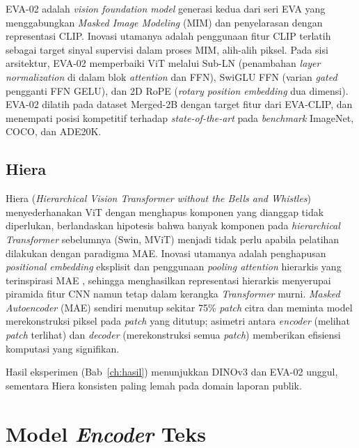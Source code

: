 EVA-02 \citep{fangEVA022023} adalah \textit{vision foundation model} generasi kedua dari seri EVA yang menggabungkan \textit{Masked Image Modeling} (MIM) dan penyelarasan dengan representasi CLIP. Inovasi utamanya adalah penggunaan fitur CLIP terlatih sebagai target sinyal supervisi dalam proses MIM, alih-alih piksel. Pada sisi arsitektur, EVA-02 memperbaiki ViT melalui Sub-LN (penambahan \textit{layer normalization} di dalam blok \textit{attention} dan FFN), SwiGLU FFN (varian \textit{gated} pengganti FFN GELU), dan 2D RoPE (\textit{rotary position embedding} dua dimensi). EVA-02 dilatih pada dataset Merged-2B dengan target fitur dari EVA-CLIP, dan menempati posisi kompetitif terhadap \textit{state-of-the-art} pada \textit{benchmark} ImageNet, COCO, dan ADE20K.

\subsection{Hiera}
\label{sec:hiera}

Hiera (\textit{Hierarchical Vision Transformer without the Bells and Whistles}) \citep{ryaliHiera2023} menyederhanakan ViT dengan menghapus komponen yang dianggap tidak diperlukan, berlandaskan hipotesis bahwa banyak komponen pada \textit{hierarchical Transformer} sebelumnya (Swin, MViT) menjadi tidak perlu apabila pelatihan dilakukan dengan paradigma MAE. Inovasi utamanya adalah penghapusan \textit{positional embedding} eksplisit dan penggunaan \textit{pooling attention} hierarkis yang terinspirasi MAE \citep{heMAE2022}, sehingga menghasilkan representasi hierarkis menyerupai piramida fitur CNN namun tetap dalam kerangka \textit{Transformer} murni. \textit{Masked Autoencoder} (MAE) sendiri menutup sekitar 75\% \textit{patch} citra dan meminta model merekonstruksi piksel pada \textit{patch} yang ditutup; asimetri antara \textit{encoder} (melihat \textit{patch} terlihat) dan \textit{decoder} (merekonstruksi semua \textit{patch}) memberikan efisiensi komputasi yang signifikan.

Hasil eksperimen (Bab~\ref{ch:hasil}) menunjukkan DINOv3 dan EVA-02 unggul, sementara Hiera konsisten paling lemah pada domain laporan publik.

\section{Model \textit{Encoder} Teks}
\label{sec:textencoder}

